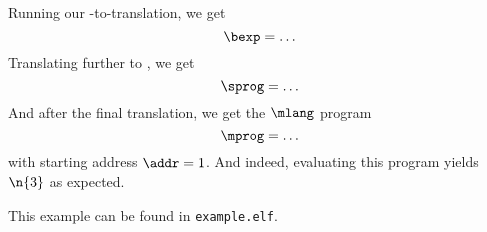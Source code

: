 Running our \hlang-to-\blang translation, we get
\[
\bexp = \ldots
\]
Translating further to \slang, we get
\[
\sprog = \ldots
\]
And after the final translation, we get the $\mlang$ program
\[
\mprog = \ldots
\]
with starting address $\addr = 1$.
And indeed, evaluating this program yields $\n{3}$ as expected.

\Twelf
This example can be found in \texttt{example.elf}.
